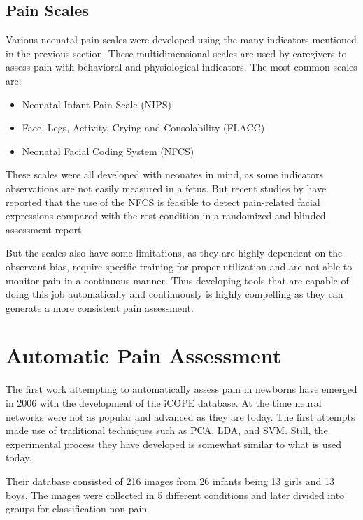 \subsection{Pain Scales}

Various neonatal pain scales were developed using the many indicators mentioned in the previous section. These multidimensional scales are used by caregivers to assess pain with behavioral and physiological indicators. The most common scales are:

\begin{itemize}
    \item Neonatal Infant Pain Scale (NIPS)
    \item Face, Legs, Activity, Crying and Consolability (FLACC)
    \item Neonatal Facial Coding System (NFCS)
\end{itemize}

These scales were all developed with neonates in mind, as some indicators observations are not easily measured in a fetus. But recent studies by \citeauthor{bernardes2018feasibility} have reported that the use of the NFCS is feasible to detect pain-related facial expressions compared with the rest condition in a randomized and blinded assessment report.

But the scales also have some limitations, as they are highly dependent on the observant bias, require specific training for proper utilization and are not able to monitor pain in a continuous manner. Thus developing tools that are capable of doing this job automatically and continuously is highly compelling as they can generate a more consistent pain assessment.

\section{Automatic Pain Assessment}

The first work attempting to automatically assess pain in newborns have emerged in 2006  with the development of the iCOPE database. At the time neural networks were not as popular and advanced as they are today. The first attempts made use of traditional techniques such as PCA, LDA, and SVM. Still, the experimental process they have developed is somewhat similar to what is used today. 

Their database consisted of 216 images from 26 infants being 13 girls and 13 boys. The images were collected in 5 different conditions and later divided into groups for classification non-pain

